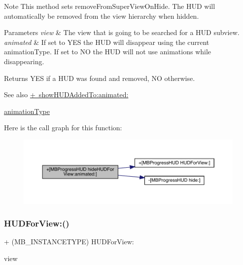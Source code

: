 \begin{DoxyNote}{Note}
This method sets {\ttfamily remove\+From\+Super\+View\+On\+Hide}. The H\+UD will automatically be removed from the view hierarchy when hidden.
\end{DoxyNote}

\begin{DoxyParams}{Parameters}
{\em view} & The view that is going to be searched for a H\+UD subview. \\
\hline
{\em animated} & If set to Y\+ES the H\+UD will disappear using the current animation\+Type. If set to NO the H\+UD will not use animations while disappearing. \\
\hline
\end{DoxyParams}
\begin{DoxyReturn}{Returns}
Y\+ES if a H\+UD was found and removed, NO otherwise.
\end{DoxyReturn}
\begin{DoxySeeAlso}{See also}
\mbox{\hyperlink{interface_m_b_progress_h_u_d_a2a981df80fbbb85db0d6c660d5882292}{+ show\+H\+U\+D\+Added\+To\+:animated\+:}} 

\mbox{\hyperlink{interface_m_b_progress_h_u_d_a71d04bb9e2839df9377ad10d03b2e468}{animation\+Type}} 
\end{DoxySeeAlso}
Here is the call graph for this function\+:\nopagebreak
\begin{figure}[H]
\begin{center}
\leavevmode
\includegraphics[width=350pt]{interface_m_b_progress_h_u_d_a7b0826c34eea1a15d62aabd00c249666_cgraph}
\end{center}
\end{figure}
\mbox{\label{interface_m_b_progress_h_u_d_a30afd912f412c6612eee7f1e17241b5b}} 
\subsubsection{\texorpdfstring{H\+U\+D\+For\+View\+:()}{HUDForView:()}\hspace{0.1cm}{\footnotesize\ttfamily [1/3]}}
{\footnotesize\ttfamily + (M\+B\+\_\+\+I\+N\+S\+T\+A\+N\+C\+E\+T\+Y\+PE) H\+U\+D\+For\+View\+: \begin{DoxyParamCaption}\item[{(U\+I\+View $\ast$)}]{view }\end{DoxyParamCaption}}

